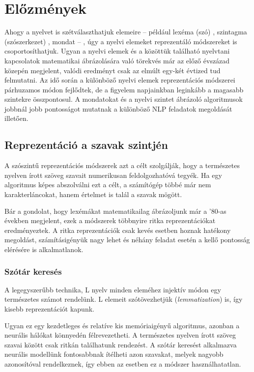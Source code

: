\chapter{Előzmények}
\label{ch:related_work}

Ahogy a nyelvet is szétválaszthatjuk elemeire – például lexéma (szó) , szintagma (szószerkezet) , mondat – , úgy a nyelvi elemeket reprezentáló módszereket is csoportosíthatjuk. Ugyan a nyelvi elemek és a közöttük található nyelvtani kapcsolatok matematikai ábrázolására való törekvés már az előző évszázad közepén megjelent, valódi eredményt csak az elmúlt egy-két évtized tud felmutatni. Az idő során a különböző nyelvi elemek reprezentációs módszerei párhuzamos módon fejlődtek, de a figyelem napjainkban leginkább a magasabb szintekre összpontosul. A mondatokat és a nyelvi szintet ábrázoló algoritmusok jobbnál jobb pontosságot mutatnak a különböző NLP feladatok megoldását illetően.


\section{Reprezentáció a szavak szintjén}

A szószintű reprezentációs módszerek azt a célt szolgálják, hogy a természetes nyelven írott szöveg szavait numerikusan feldolgozhatóvá tegyék. Ha egy algoritmus képes abszolválni ezt a célt, a számítógép többé már nem karakterláncokat, hanem értelmet is talál a szavak mögött.

Bár a gondolat, hogy lexémákat matematikailag ábrázoljunk már a '80-as években megjelent, ezek a módszerek többnyire ritka reprezentációkat eredményeztek. A ritka reprezentációk csak kevés esetben hoznak hatékony megoldást, számításigényük nagy lehet és néhány feladat esetén a kellő pontosság elérésére is alkalmatlanok.

\subsection{Szótár keresés}

A legegyszerűbb technika, L nyelv minden eleméhez injektív módon egy természetes számot rendelünk. L elemeit szótövezhetjük (\textit{lemmatization}) is, így kisebb reprezentációt kapunk.

Ugyan ez egy kezdetleges és relatíve kis memóriaigényű algoritmus, azonban a neurális hálókat könnyedén félrevezetheti. A természetes nyelven írott szöveg szavai között csak ritkán találhatunk rendezést. A szótár keresést alkalmazva neurális modellünk fontosabbnak ítélheti  azon szavakat, melyek nagyobb azonosítóval rendelkeznek, így ebben az esetben ez a módszer használhatatlan.

